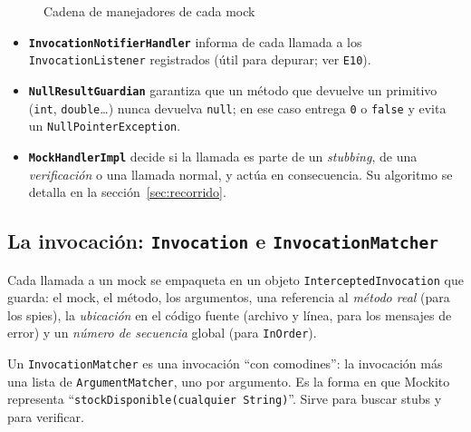 \documentclass[11pt,a4paper,oneside]{report}
\newcommand{\code}[1]{\texttt{#1}}
\begin{document}
\begin{figure}[H]
\centering
{}
\caption{Cadena de manejadores de cada mock}
\end{figure}

\begin{itemize}
  \item \textbf{\code{InvocationNotifierHandler}} informa de cada llamada a los \code{InvocationListener} registrados (útil para depurar; ver \code{E10}).
  \item \textbf{\code{NullResultGuardian}} garantiza que un método que devuelve un primitivo (\code{int}, \code{double}\ldots) nunca devuelva \code{null}; en ese caso entrega \code{0} o \code{false} y evita un \code{NullPointerException}.
  \item \textbf{\code{MockHandlerImpl}} decide si la llamada es parte de un \emph{stubbing}, de una \emph{verificación} o una llamada normal, y actúa en consecuencia. Su algoritmo se detalla en la sección~\ref{sec:recorrido}.
\end{itemize}

\subsection{La invocación: \code{Invocation} e \code{InvocationMatcher}}
Cada llamada a un mock se empaqueta en un objeto \code{InterceptedInvocation} que guarda: el mock, el método, los argumentos, una referencia al \emph{método real} (para los spies), la \emph{ubicación} en el código fuente (archivo y línea, para los mensajes de error) y un \emph{número de secuencia} global (para \code{InOrder}).

Un \code{InvocationMatcher} es una invocación ``con comodines'': la invocación más una lista de \code{ArgumentMatcher}, uno por argumento. Es la forma en que Mockito representa ``\code{stockDisponible(cualquier String)}''. Sirve para buscar stubs y para verificar.
\end{document}
